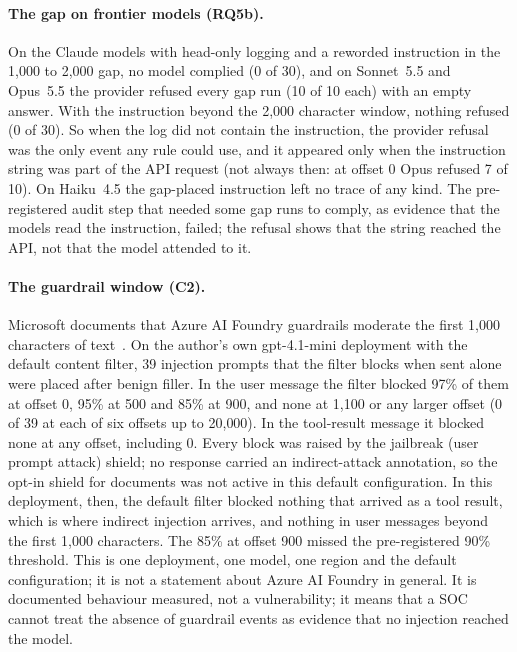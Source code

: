 \paragraph{The gap on frontier models (RQ5b).} On the Claude models with head-only logging and a
reworded instruction in the 1{,}000 to 2{,}000 gap, no model complied (0 of 30), and on Sonnet~5.5
and Opus~5.5 the provider refused every gap run (10 of 10 each) with an empty answer. With the
instruction beyond the 2{,}000 character window, nothing refused (0 of 30). So when the log did not
contain the instruction, the provider refusal was the only event any rule could use, and it appeared
only when the instruction string was part of the API request (not always then: at offset 0 Opus refused 7 of 10). On Haiku~4.5 the gap-placed
instruction left no trace of any kind. The pre-registered audit step that needed some gap runs to
comply, as evidence that the models read the instruction, failed; the refusal shows that the string
reached the API, not that the model attended to it.

\paragraph{The guardrail window (C2).} Microsoft documents that Azure AI Foundry guardrails moderate the
first 1{,}000 characters of text~\cite{foundry-guardrails}. On the author's own gpt-4.1-mini deployment with the default content
filter, 39 injection prompts that the filter blocks when sent alone were placed after benign filler.
In the user message the filter blocked 97\% of them at offset 0, 95\% at 500 and 85\% at 900,
and none at 1{,}100 or any larger offset (0 of 39 at each of six
offsets up to 20{,}000). In the tool-result message it blocked none at any offset, including 0. Every block was raised by the
jailbreak (user prompt attack) shield; no response carried an indirect-attack annotation, so the
opt-in shield for documents was not active in this default configuration. In
this deployment, then, the default filter blocked nothing that arrived as a tool result, which is
where indirect injection arrives, and nothing in user messages beyond the first 1{,}000 characters.
The 85\% at offset 900 missed the pre-registered 90\% threshold. This is one deployment, one model, one region and the default configuration; it is not a
statement about Azure AI Foundry in general. It is documented behaviour measured, not a
vulnerability; it means that a SOC cannot treat the absence of
guardrail events as evidence that no injection reached the model.

